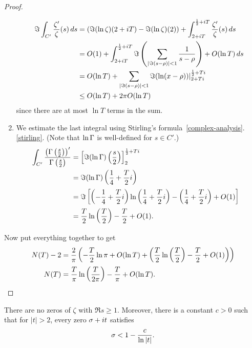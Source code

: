 \begin{proof}
\begin{enumerate}
\begin{align*}
\Im\int_{C'}\frac{\zeta'}{\zeta}(s)\,ds
&=(\Im(\ln\zeta)(2+iT)-{\Im(\ln\zeta)(2)})+\int_{2+iT}^{\frac{1}{2}+iT} \frac{\zeta'}{\zeta}(s)\,ds\\
&=O(1)+\int_{2+iT}^{\frac{1}{2}+iT} \Im\left( {\sum_{|\Im(s-\rho)|<1}\frac{1}{s-\rho}} \right)+O(\ln T)\,ds\\
&=O(\ln T)+\sum_{|\Im(s-\rho)|<1}\Im(\ln(x-\rho))|^{\frac{1}{2}+Ti}_{2+Ti}\\
&\le O(\ln T)+2\pi O(\ln T)
\end{align*}
since there are at most $\ln T$ terms in the sum.
\item We estimate the last integral using Stirling's formula~\ref{complex-analysis}.\ref{stirling}. (Note that $\ln\Gamma$ is well-defined for $s\in C'$.)
\begin{align*}
\int_{C'}\frac{\pa{\Ga\pf s2}'}{\Ga\pf s2}
&=\ba{\Im(\ln\Ga)\pf s2}^{\rc 2+Ti}_2\\
&=\Im(\ln \Ga)\pa{\frac 14+\frac{T}{2}i}\\
&=\Im\ba{\pa{-\rc 4+\frac T2i}\ln\pa{\rc 4+\frac T2i}-\pa{\rc 4+\frac T2i}+O(1)}\\%
&=\frac T2\ln\pf T2-\frac T2+O(1).&\qedhere
\end{align*}
\end{enumerate}
Now put everything together to get
\begin{align*}
N(T)-2&=\frac{2}{\pi}\left( {-\frac T2\ln \pi+O(\ln T)+\left( {\frac T2\ln\left( {\frac{T}{2}} \right)-\frac T2+O(1)} \right)} \right)\\
N(T)&=\frac{T}{\pi}\ln\left( {\frac{T}{2\pi}} \right)-\frac{T}{\pi}+O(\ln T).
\end{align*}
\end{proof}
\begin{thm}
There are no zeros of $\zeta$ with $\Re s\ge 1$. Moreover, there is a constant $c>0$ such that for $|t|>2$, every zero $\sigma+it$ satisfies
\[
\sigma<1-\frac{c}{\ln|t|}.
\]
\end{thm}

